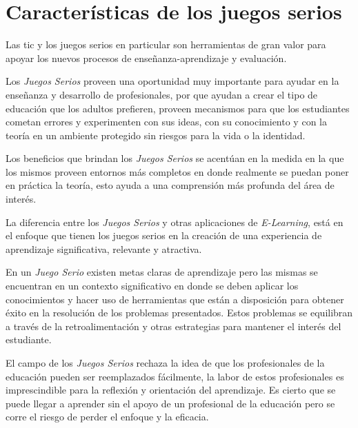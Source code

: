 \section{Características de los juegos serios}

Las \Gls{tic} y los juegos serios en particular son herramientas de gran valor
para apoyar los nuevos procesos de enseñanza-aprendizaje y
evaluación\cite{guenaga2013serious}. 


Los \emph{Juegos Serios} proveen una oportunidad muy importante para ayudar en
la enseñanza y desarrollo de profesionales\cite{mariluz:seiousgames}, por que
ayudan a crear el tipo de educación que los adultos prefieren, proveen
mecanismos para que los estudiantes cometan errores y experimenten con sus
ideas, con su conocimiento y con la teoría en un ambiente protegido sin riesgos
para la vida o la identidad\cite{sg:aoverview,education:games}. 

Los beneficios que brindan los \emph{Juegos Serios} se acentúan en la medida en
la que los mismos proveen entornos más completos en donde realmente se puedan
poner en práctica la teoría, esto ayuda a una comprensión más profunda del área
de interés\cite{sg:aoverview}.

La diferencia entre los \emph{Juegos Serios} y otras aplicaciones de
\emph{E-Learning}, está en el enfoque que tienen los juegos serios en la creación
de una experiencia de aprendizaje significativa, relevante y
atractiva\cite{sg:aoverview}.

En un \emph{Juego Serio} existen metas claras de aprendizaje pero las mismas se
encuentran en un contexto significativo en donde se deben aplicar los
conocimientos y hacer uso de herramientas que están a disposición para obtener
éxito en la resolución de los problemas presentados. Estos problemas se
equilibran a través de la retroalimentación y otras estrategias para mantener el
interés del estudiante\cite{sg:aoverview}.

El campo de los \emph{Juegos Serios} rechaza la idea de que los profesionales de
la educación pueden ser reemplazados fácilmente, la labor de estos profesionales
es imprescindible para la reflexión y orientación del
aprendizaje\cite{elearning:seiousgames}. Es cierto que se puede llegar a
aprender sin el apoyo de un profesional de la educación pero se corre el riesgo
de perder el enfoque y la eficacia\cite{elearning:seiousgames}. 

